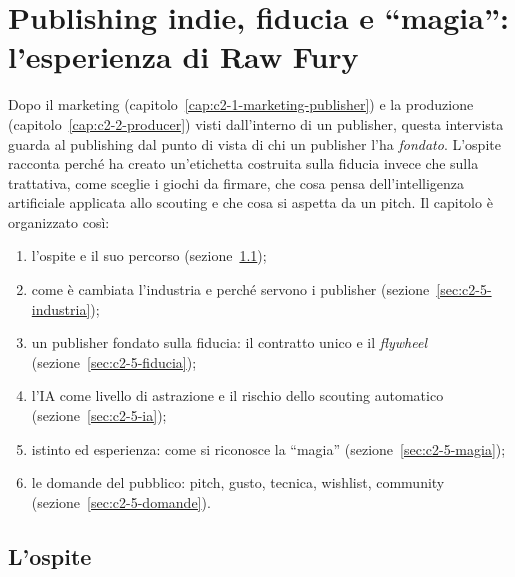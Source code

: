 
\chapter[Publishing indie e originalità: Raw Fury]{Publishing indie, fiducia e
``magia'': l'esperienza di Raw Fury}
\label{cap:c2-5-raw-fury}

Dopo il marketing (capitolo~\ref{cap:c2-1-marketing-publisher}) e la produzione
(capitolo~\ref{cap:c2-2-producer}) visti dall'interno di un publisher, questa
intervista guarda al publishing dal punto di vista di chi un publisher l'ha
\emph{fondato}. L'ospite racconta perché ha creato un'etichetta costruita sulla
fiducia invece che sulla trattativa, come sceglie i giochi da firmare, che cosa
pensa dell'intelligenza artificiale applicata allo scouting e che cosa si aspetta
da un pitch. Il capitolo è organizzato così:
\begin{enumerate}
  \item l'ospite e il suo percorso (sezione~\ref{sec:c2-5-ospite});
  \item come è cambiata l'industria e perché servono i publisher
        (sezione~\ref{sec:c2-5-industria});
  \item un publisher fondato sulla fiducia: il contratto unico e il
        \emph{flywheel} (sezione~\ref{sec:c2-5-fiducia});
  \item l'IA come livello di astrazione e il rischio dello scouting automatico
        (sezione~\ref{sec:c2-5-ia});
  \item istinto ed esperienza: come si riconosce la ``magia''
        (sezione~\ref{sec:c2-5-magia});
  \item le domande del pubblico: pitch, gusto, tecnica, wishlist, community
        (sezione~\ref{sec:c2-5-domande}).
\end{enumerate}

\section{L'ospite}
\label{sec:c2-5-ospite}

